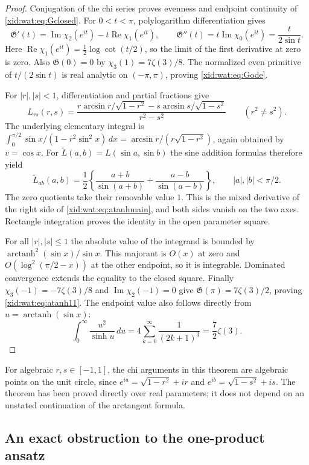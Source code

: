 \begin{proof}
Conjugation of the chi series proves evenness and endpoint
continuity of \eqref{xid:wat:eq:Gclosed}. For $0<t<\pi$,
polylogarithm differentiation gives
\[
 \mathfrak G'(t)=\operatorname{Im}\chi_2(e^{it})
                    -t\operatorname{Re}\chi_1(e^{it}),
 \qquad
 \mathfrak G''(t)=t\operatorname{Im}\chi_0(e^{it})
                 =\frac{t}{2\sin t}.
\]
Here $\operatorname{Re}\chi_1(e^{it})=\tfrac12\log\cot(t/2)$,
so the limit of the first derivative at zero is zero. Also
$\mathfrak G(0)=0$ by $\chi_3(1)=7\zeta(3)/8$.
The normalized even primitive of $t/(2\sin t)$ is real analytic
on $(-\pi,\pi)$, proving \eqref{xid:wat:eq:Gode}.

For $|r|,|s|<1$, differentiation and partial fractions give
\[
 L_{rs}(r,s)=
 \frac{r\arcsin r/\sqrt{1-r^2}
       -s\arcsin s/\sqrt{1-s^2}}{r^2-s^2}
 \qquad(r^2\ne s^2).
\]
The underlying elementary integral is
$\int_0^{\pi/2}\sin x/(1-r^2\sin^2x)\,dx
 =\arcsin r/(r\sqrt{1-r^2})$, again obtained by $v=\cos x$.
For $\widetilde L(a,b)=L(\sin a,\sin b)$ the sine addition formulas
therefore yield
\[
 \widetilde L_{ab}(a,b)
   =\frac12\left\{
       \frac{a+b}{\sin(a+b)}+\frac{a-b}{\sin(a-b)}\right\},
 \qquad |a|,|b|<\pi/2.
\]
The zero quotients take their removable value $1$. This is the
mixed derivative of the right side of \eqref{xid:wat:eq:atanhmain},
and both sides vanish on the two axes. Rectangle integration proves
the identity in the open parameter square.

For all $|r|,|s|\leq1$ the absolute value of the integrand is bounded
by $\operatorname{arctanh}^2(\sin x)/\sin x$. This majorant is
$O(x)$ at zero and $O(\log^2(\pi/2-x))$ at the other endpoint,
so it is integrable. Dominated convergence extends the equality
to the closed square. Finally
$\chi_3(-1)=-7\zeta(3)/8$ and
$\operatorname{Im}\chi_2(-1)=0$ give
$\mathfrak G(\pi)=7\zeta(3)/2$, proving
\eqref{xid:wat:eq:atanh11}.
The endpoint value also follows directly from
$u=\operatorname{arctanh}(\sin x)$:
\[
 \int_0^\infty\frac{u^2}{\sinh u}\,du
    =4\sum_{k=0}^\infty\frac1{(2k+1)^3}
    =\frac72\zeta(3).
\]
\end{proof}

For algebraic $r,s\in[-1,1]$, the chi arguments in this theorem are
algebraic points on the unit circle, since
$e^{ia}=\sqrt{1-r^2}+ir$ and
$e^{ib}=\sqrt{1-s^2}+is$. The theorem has been proved directly over
real parameters; it does not depend on an unstated continuation of
the arctangent formula.

\subsection{An exact obstruction to the one-product ansatz}

